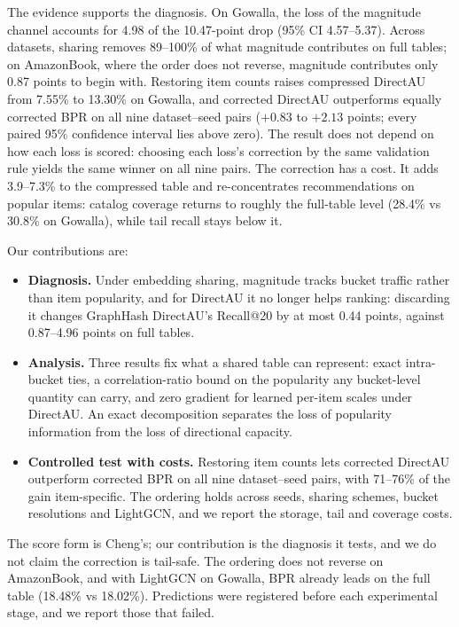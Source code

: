 The evidence supports the diagnosis. On Gowalla, the loss of the magnitude channel accounts for 4.98 of the 10.47-point drop (95\% CI 4.57--5.37). Across datasets, sharing removes 89--100\% of what magnitude contributes on full tables; on AmazonBook, where the order does not reverse, magnitude contributes only 0.87 points to begin with. Restoring item counts raises compressed DirectAU from 7.55\% to 13.30\% on Gowalla, and corrected DirectAU outperforms equally corrected BPR on all nine dataset--seed pairs ($+0.83$ to $+2.13$ points; every paired 95\% confidence interval lies above zero). The result does not depend on how each loss is scored: choosing each loss's correction by the same validation rule yields the same winner on all nine pairs. The correction has a cost. It adds 3.9--7.3\% to the compressed table and re-concentrates recommendations on popular items: catalog coverage returns to roughly the full-table level (28.4\% vs 30.8\% on Gowalla), while tail recall stays below it.

Our contributions are:
\begin{itemize}
\item \textbf{Diagnosis.} Under embedding sharing, magnitude tracks bucket traffic rather than item popularity, and for DirectAU it no longer helps ranking: discarding it changes GraphHash DirectAU's Recall@20 by at most 0.44 points, against 0.87--4.96 points on full tables.
\item \textbf{Analysis.} Three results fix what a shared table can represent: exact intra-bucket ties, a correlation-ratio bound on the popularity any bucket-level quantity can carry, and zero gradient for learned per-item scales under DirectAU. An exact decomposition separates the loss of popularity information from the loss of directional capacity.
\item \textbf{Controlled test with costs.} Restoring item counts lets corrected DirectAU outperform corrected BPR on all nine dataset--seed pairs, with 71--76\% of the gain item-specific. The ordering holds across seeds, sharing schemes, bucket resolutions and LightGCN, and we report the storage, tail and coverage costs.
\end{itemize}

The score form is Cheng's; our contribution is the diagnosis it tests, and we do not claim the correction is tail-safe. The ordering does not reverse on AmazonBook, and with LightGCN on Gowalla, BPR already leads on the full table (18.48\% vs 18.02\%). Predictions were registered before each experimental stage, and we report those that failed.

